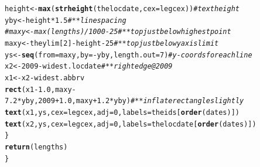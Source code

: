 \documentclass{article}\usepackage[]{graphicx}\usepackage[]{color}
\makeatletter
\newcommand{\hlnum}[1]{\textcolor[rgb]{0.686,0.059,0.569}{#1}}%
\newcommand{\hlcom}[1]{\textcolor[rgb]{0.678,0.584,0.686}{\textit{#1}}}%
\newcommand{\hlopt}[1]{\textcolor[rgb]{0,0,0}{#1}}%
\newcommand{\hlstd}[1]{\textcolor[rgb]{0.345,0.345,0.345}{#1}}%
\newcommand{\hlkwb}[1]{\textcolor[rgb]{0.69,0.353,0.396}{#1}}%
\newcommand{\hlkwc}[1]{\textcolor[rgb]{0.333,0.667,0.333}{#1}}%
\newcommand{\hlkwd}[1]{\textcolor[rgb]{0.737,0.353,0.396}{\textbf{#1}}}%
\newenvironment{kframe}{%
 \def\at@end@of@kframe{}%
 \ifinner\ifhmode%
  \def\at@end@of@kframe{\end{minipage}}%
  \begin{minipage}{\columnwidth}%
 \fi\fi%
 \def\FrameCommand##1{\hskip\@totalleftmargin \hskip-\fboxsep
 \colorbox{shadecolor}{##1}\hskip-\fboxsep
     \hskip-\linewidth \hskip-\@totalleftmargin \hskip\columnwidth}%
 \MakeFramed {\advance\hsize-\width
   \@totalleftmargin\z@ \linewidth\hsize
   \@setminipage}}%
 {\par\unskip\endMakeFramed%
 \at@end@of@kframe}
\newenvironment{knitrout}{}{} %
\makeatother
\begin{document}
\begin{knitrout}
\begin{kframe}
\begin{alltt}
    \hlstd{height}         \hlkwb{<-} \hlkwd{max}\hlstd{(}\hlkwd{strheight}\hlstd{(thelocdate,} \hlkwc{cex}\hlstd{=legcex))}\hlcom{# text height}
    \hlstd{yby}  \hlkwb{<-} \hlstd{height} \hlopt{*} \hlnum{1.5}                                    \hlcom{# ** line spacing}
  \hlcom{# maxy <- max(lengths)/1000 - 25                          # ** top just below highest point}
    \hlstd{maxy} \hlkwb{<-} \hlstd{theylim[}\hlnum{2}\hlstd{]} \hlopt{-} \hlstd{height} \hlopt{-} \hlnum{25}                        \hlcom{# ** top just below y axis limit}
    \hlstd{ys}   \hlkwb{<-} \hlkwd{seq}\hlstd{(}\hlkwc{from}\hlstd{=maxy,} \hlkwc{by}\hlstd{=}\hlopt{-}\hlstd{yby,} \hlkwc{length.out}\hlstd{=}\hlnum{7}\hlstd{)}           \hlcom{#    y-coords for each line}
    \hlstd{x2}   \hlkwb{<-} \hlnum{2009} \hlopt{-} \hlstd{widest.locdate}                           \hlcom{# ** right edge @ 2009}
    \hlstd{x1}   \hlkwb{<-}   \hlstd{x2} \hlopt{-} \hlstd{widest.abbrv}
    \hlkwd{rect}\hlstd{(x1}\hlopt{-}\hlnum{1.0}\hlstd{, maxy}\hlopt{-}\hlnum{7.2}\hlopt{*}\hlstd{yby,} \hlnum{2009}\hlopt{+}\hlnum{1.0}\hlstd{, maxy}\hlopt{+}\hlnum{1.2}\hlopt{*}\hlstd{yby)}      \hlcom{# ** inflate rectangle slightly}
    \hlkwd{text}\hlstd{(x1, ys,} \hlkwc{cex}\hlstd{=legcex,} \hlkwc{adj}\hlstd{=}\hlnum{0}\hlstd{,} \hlkwc{labels}\hlstd{=theids[}\hlkwd{order}\hlstd{(dates)])}
    \hlkwd{text}\hlstd{(x2, ys,} \hlkwc{cex}\hlstd{=legcex,} \hlkwc{adj}\hlstd{=}\hlnum{0}\hlstd{,} \hlkwc{labels}\hlstd{=thelocdate[}\hlkwd{order}\hlstd{(dates)])}
  \hlstd{\}}
  \hlkwd{return}\hlstd{(lengths)}
\hlstd{\}}
\end{alltt}
\end{kframe}
\end{knitrout}
\end{document}
